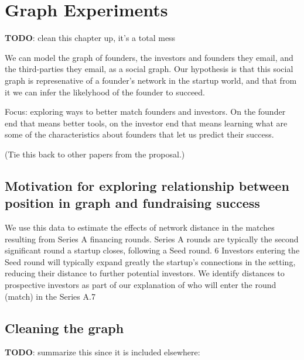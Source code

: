 \chapter{Graph Experiments}

\textbf{TODO}: clean this chapter up, it's a total mess

We can model the graph of founders, the investors and founders they email, and the third-parties they email, as a social graph. Our hypothesis is that this social graph is represenative of a founder's network in the startup world, and that from it we can infer the likelyhood of the founder to succeed.

Focus: exploring ways to better match founders and investors. On the founder end that means better tools, on the investor end that means learning what are some of the characteristics about founders that let us predict their success.

(Tie this back to other papers from the proposal.)

\section{Motivation for exploring relationship between position in graph and fundraising success}

We use this data to estimate the effects of network distance in the matches resulting from
Series A financing rounds. Series A rounds are typically the second significant round a startup
closes, following a Seed round.
6 Investors entering the Seed round will typically expand greatly
the startup’s connections in the setting, reducing their distance to further potential investors. We
identify distances to prospective investors as part of our explanation of who will enter the round
(match) in the Series A.7 \cite{pasquini2017matching}


\section{Cleaning the graph}

\textbf{TODO}: summarize this since it is included elsewhere:

